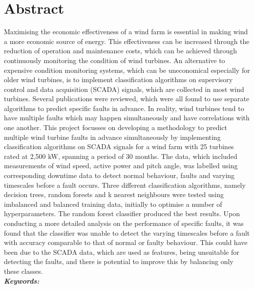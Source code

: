 
\chapter{Abstract}

Maximising the economic effectiveness of a wind farm is essential in making wind a more economic source of energy. This effectiveness can be increased through the reduction of operation and maintenance costs, which can be achieved through continuously monitoring the condition of wind turbines. An alternative to expensive condition monitoring systems, which can be uneconomical especially for older wind turbines, is to implement classification algorithms on supervisory control and data acquisition (SCADA) signals, which are collected in most wind turbines. Several publications were reviewed, which were all found to use separate algorithms to predict specific faults in advance. In reality, wind turbines tend to have multiple faults which may happen simultaneously and have correlations with one another. This project focusses on developing a methodology to predict multiple wind turbine faults in advance simultaneously by implementing classification algorithms on SCADA signals for a wind farm with 25 turbines rated at 2,500 kW, spanning a period of 30 months. The data, which included measurements of wind speed, active power and pitch angle, was labelled using corresponding downtime data to detect normal behaviour, faults and varying timescales before a fault occurs. Three different classification algorithms, namely decision trees, random forests and k nearest neighbours were tested using imbalanced and balanced training data, initially to optimise a number of hyperparameters. The random forest classifier produced the best results. Upon conducting a more detailed analysis on the performance of specific faults, it was found that the classifier was unable to detect the varying timescales before a fault with accuracy comparable to that of normal or faulty behaviour. This could have been due to the SCADA data, which are used as features, being unsuitable for detecting the faults, and there is potential to improve this by balancing only these classes.
\\[.5cm]
\noindent\textbf{\textit{Keywords:}} \keywords{}
